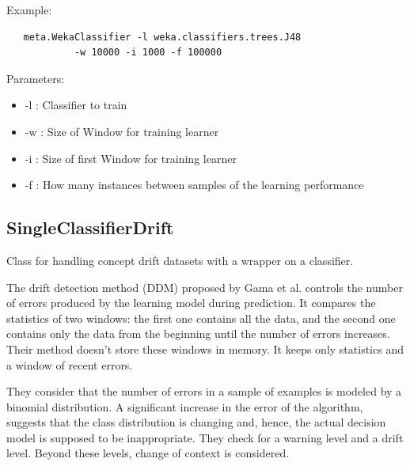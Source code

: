 \documentclass[a4paper,12pt,twoside]{book}
\begin{document}
 Example:
\begin{footnotesize}
\begin{verbatim}               
   meta.WekaClassifier -l weka.classifiers.trees.J48  
            -w 10000 -i 1000 -f 100000
\end{verbatim} \end{footnotesize}

Parameters:

\begin{itemize}
\item -l : Classifier to train
\item -w : Size of Window for training learner
\item -i : Size of first Window for training learner
\item -f : How many instances between samples of the learning performance
\end{itemize}

 \subsection{SingleClassifierDrift} Class for handling concept drift datasets with a wrapper on a
 classifier.

The drift detection method (DDM) proposed by Gama et al. controls 
the number of errors produced by the learning model during prediction. 
It compares the statistics of two windows: the first one contains all the data, 
and the second one contains only the data from the beginning until the number of
errors increases. Their method doesn't store these windows in memory. It keeps 
only statistics and a window of recent errors.

They consider that the number of errors in a sample of examples is modeled by a binomial 
distribution. A significant increase in the error of the algorithm, suggests
that the class distribution is changing and, hence, the actual decision model is
supposed to be inappropriate. They check for a warning level and a drift level. Beyond
these levels, change of context is considered.
\end{document}
